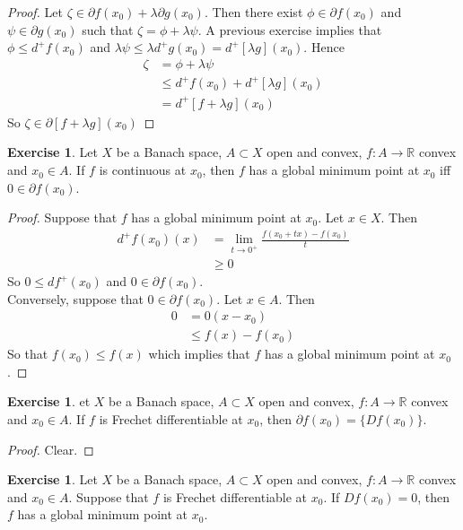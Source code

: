 \documentclass[12pt]{amsart}
\theoremstyle{definition}
\newtheorem{ex}[definition]{Exercise}
\newcommand{\lam}{\lambda}
\newcommand{\R}{\mathbb{R}}
\newcommand{\p}{\partial}
\newcommand{\lex}[1]{\label{ex:#1}}
\begin{document}
	\begin{proof}
	Let $\zeta \in \p f(x_0) + \lam \p g(x_0)$. Then there exist $\phi \in \p f(x_0)$ and $\psi \in \p g(x_0)$ such that $\zeta = \phi + \lam \psi$. A previous exercise implies that $\phi \leq d^+f(x_0)$ and $\lam \psi \leq \lam d^+g(x_0) = d^+[\lam g](x_0)$. Hence 
	\begin{align*}
	\zeta
	&= \phi + \lam \psi \\
	&\leq d^+f(x_0) + d^+[\lam g](x_0) \\
	&= d^+[f + \lam g](x_0)
	\end{align*}
	So $\zeta \in \p [f+\lam g](x_0)$
	\end{proof}
	
	\begin{ex} \lex{}
	Let $X$ be a Banach space, $A \subset X$ open and convex, $f:A \rightarrow \R$ convex and $x_0 \in A$. If $f$ is continuous at $x_0$, then $f$ has a global minimum point at $x_0$ iff $0 \in \p f(x_0)$.
	\end{ex}
	
	\begin{proof}
	Suppose that $f$ has a global minimum point at $x_0$. Let $x \in X$. Then 
	\begin{align*}
	d^+f(x_0)(x) 
	&= \lim_{t \rightarrow 0^+} \frac{f(x_0 + tx) - f(x_0)}{t} \\
	& \geq 0
	\end{align*}
	So $0 \leq df^+(x_0)$ and $0 \in \p f(x_0)$.\\
	Conversely, suppose that $0 \in \p f(x_0)$. Let $x \in A$. Then 
	\begin{align*}
	0
	& = 0(x - x_0) \\
	& \leq f(x) - f(x_0)
	\end{align*}
	So that $f(x_0) \leq f(x)$ which implies that $f$ has a global minimum point at $x_0$.
	\end{proof}
	
	\begin{ex}
	et $X$ be a Banach space, $A \subset X$ open and convex, $f:A \rightarrow \R$ convex and $x_0 \in A$. If $f$ is Frechet differentiable at $x_0$, then $\p f(x_0) = \{Df(x_0)\}$. 
	\end{ex}	
	
	\begin{proof}
	Clear.
	\end{proof}
	
	\begin{ex}
	Let $X$ be a Banach space, $A \subset X$ open and convex, $f:A \rightarrow \R$ convex and $x_0 \in A$. Suppose that $f$ is Frechet differentiable at $x_0$. If $Df(x_0) = 0$, then $f$ has a global minimum point at $x_0$. 
	\end{ex}
	
\end{document}
